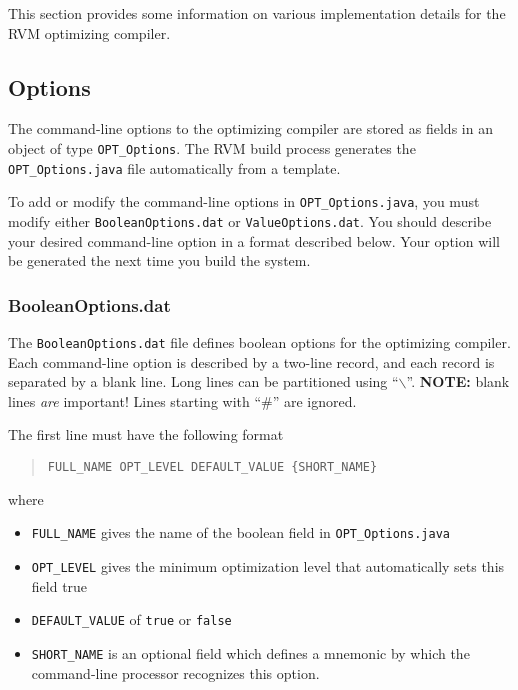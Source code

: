 This section provides some information on various
implementation details for the RVM optimizing compiler.

\subsection{Options}

The command-line options to the optimizing compiler are
stored as fields in an object of type {\tt OPT\_Options}.
The RVM build process generates the {\tt OPT\_Options.java} 
file automatically from a template.  

To add or modify the command-line options in {\tt OPT\_Options.java},
you must modify either {\tt BooleanOptions.dat} or 
{\tt ValueOptions.dat}.  You should describe your desired
command-line option in a format described below.
Your option will be generated the next time you build the
system.

\subsubsection{BooleanOptions.dat}

The {\tt BooleanOptions.dat} file defines boolean options for
the optimizing compiler.  Each command-line option is
described by a two-line record, and each record is separated
by a blank line.  Long lines can be partitioned using ``$\backslash$''.
{\bf NOTE:} blank lines {\em are} important!
Lines starting with ``\#'' are ignored.

The first line must have the following format
\begin{quote}
\begin{verbatim}
FULL_NAME OPT_LEVEL DEFAULT_VALUE {SHORT_NAME}
\end{verbatim}
\end{quote}
where
\begin{itemize}
\item {\tt FULL\_NAME} gives the name of the boolean field in {\tt OPT\_Options.java}
\item {\tt OPT\_LEVEL} gives the minimum optimization level that automatically sets this field true
\item {\tt DEFAULT\_VALUE} of {\tt true} or {\tt false}
\item {\tt SHORT\_NAME} is an optional field which defines a mnemonic by which the command-line processor recognizes this option.
\end{itemize}

